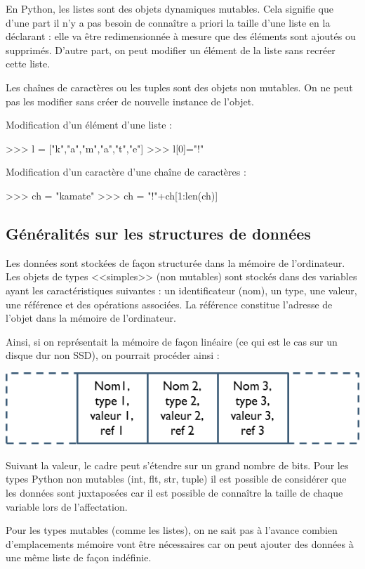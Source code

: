 \documentclass[10pt,fleqn]{article} %
\begin{document}
En Python, les listes sont des objets dynamiques mutables. Cela signifie que d'une part il n'y a pas besoin de connaître a priori la taille d'une liste en la déclarant : elle va être redimensionnée à mesure que des éléments sont ajoutés ou supprimés. D'autre part, on peut modifier un élément de la liste sans recréer cette liste. 
\begin{exemple}
Les chaînes de caractères ou les tuples sont des objets non mutables. On ne peut pas les modifier sans créer de nouvelle instance de l'objet.

Modification d'un élément d'une liste :
\begin{python}
>>> l = ["k","a","m","a","t","e"]
>>> l[0]="!"
\end{python}

Modification d'un caractère d'une chaîne de caractères :
\begin{python}
>>> ch = "kamate"
>>> ch = "!"+ch[1:len(ch)]
\end{python}
\end{exemple}

\subsection{Généralités sur les structures de données}
Les données sont stockées de façon structurée dans la mémoire de l'ordinateur. Les objets de types <<simples>> (non mutables) sont stockés dans des variables ayant les caractéristiques suivantes : un identificateur (nom), un type, une valeur, une référence et des opérations associées. La référence constitue l'adresse de l'objet dans la mémoire de l'ordinateur. 

Ainsi, si on représentait la mémoire de façon linéaire (ce qui est le cas sur un disque dur non SSD), on pourrait procéder ainsi :
\begin{center}
\includegraphics[width=.4\linewidth]{images/memoire_01}
\end{center}
Suivant la valeur, le cadre peut s'étendre sur un grand nombre de bits. Pour les types Python non mutables (int, flt, str, tuple) il est possible de considérer que les données sont juxtaposées car il est possible de connaître la taille de chaque variable lors de l'affectation. 

Pour les types mutables (comme les listes), on ne sait pas à l'avance combien d'emplacements mémoire vont être nécessaires car on peut ajouter des données à une même liste de façon indéfinie. 
\end{document}
